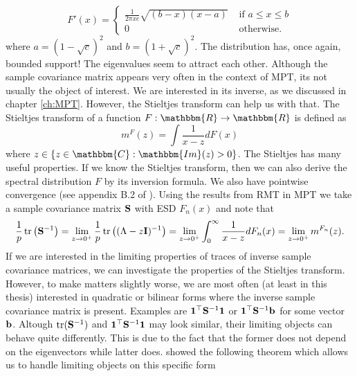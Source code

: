 \documentclass[]{book}\usepackage{knitr}
\begin{document}
$$
F'(x) = \begin{cases}
\frac{1}{2\pi x c} \sqrt{(b-x)(x-a)} & \text{ if } a \leq x \leq b\\
0 & \text{ otherwise.}
\end{cases}
$$
where $a=(1-\sqrt{c})^2$ and $b=(1+\sqrt{c})^2$. The distribution has, once again, bounded support! The eigenvalues seem to attract each other. Although the sample covariance matrix appears very often in the context of MPT, its not usually the object of interest. We are interested in its inverse, as we discussed in chapter \ref{ch:MPT}. However, the Stieltjes transform can help us with that. The Stieltjes transform of a function $F: \mathbbm{R} \rightarrow \mathbbm{R}$ is defined as 
\begin{equation}\label{eqn:stieltjes}
m^F(z) = \int \frac{1}{x-z}dF(x)
\end{equation}
where $z \in \{z \in \mathbbm{C}: \mathbbm{Im}(z)>0 \}$. The Stieltjes has many useful properties. If we know the Stieltjes transform, then we can also derive the spectral distribution $F$ by its inversion formula. We also have pointwise convergence (see appendix B.2 of \citet{bai2010spectral}). Using the results from RMT in MPT we take a sample covariance matrix $\mathbf{S}$ with ESD $F_n(x)$ and note that
\begin{equation}
\frac{1}{p}\operatorname{tr} \left( \mathbf{S}^{-1} \right) = \lim_{z\rightarrow 0^+} \frac{1}{p} \operatorname{tr} \left( (\Lambda -z\mathbf{I})^{-1} \right) = \lim_{z\rightarrow 0^+} \int_0^\infty \frac{1}{x - z} dF_n(x) = \lim_{z\rightarrow 0^+} m^{F_n}(z).
\end{equation}
If we are interested in the limiting properties of traces of inverse sample covariance matrices, we can investigate the properties of the Stieltjes transform. However, to make matters slightly worse, we are most often (at least in this thesis) interested in quadratic or bilinear forms where the inverse sample covariance matrix is present. Examples are $\mathbf{1}^\top \mathbf{S}^{-1} \mathbf{1}$ or $\mathbf{1}^\top \mathbf{S}^{-1} \mathbf{b}$ for some vector $\mathbf{b}$. Altough $\operatorname{tr}(\mathbf{S}^{-1})$ and $\mathbf{1}^\top \mathbf{S}^{-1} \mathbf{1}$ may look similar, their limiting objects can behave quite differently. This is due to the fact that the former does not depend on the eigenvectors while latter does. \citet{rubio2011spectral} showed the following theorem which allows us to handle limiting objects on this specific form
\end{document}
